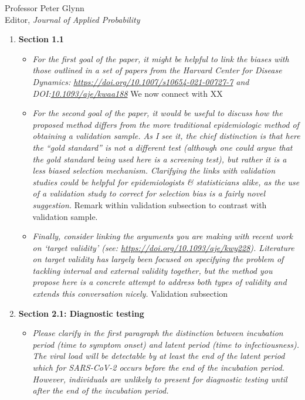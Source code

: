 \documentclass[11pt]{letter} %
\begin{document}
\begin{letter}{Professor
	Peter Glynn\\
	Editor, {\em Journal of Applied Probability}}
\begin{enumerate}
\vspace{5mm}
Section XX now discusses the purposes of testing.
\vspace{5mm}

\item {\bf Section 1.1}
\begin{itemize}
	\item {\it For the first goal of the paper, it might be helpful to link the biases with those outlined in a set of papers from the Harvard Center for Disease Dynamics: \url{https://doi.org/10.1007/s10654-021-00727-7} and DOI:\url{10.1093/aje/kwaa188}}
	\vspace{5mm}
	We now connect with XX
	\vspace{5mm}
	\item {\it For the second goal of the paper, it would be useful to discuss how the proposed method differs from the more traditional epidemiologic method of obtaining a validation sample. As I see it, the chief distinction is that here the “gold standard” is not a different test (although one could argue that the gold standard being used here is a screening test), but rather it is a less biased selection mechanism. Clarifying the links with validation studies could be helpful for epidemiologists \& statisticians alike, as the use of a validation study to correct for selection bias is a fairly novel suggestion.}
	\vspace{5mm}
	Remark within validation subsection to contrast with validation sample.
	\vspace{5mm}
	\item {\it Finally, consider linking the arguments you are making with recent work on ‘target validity’ (see: \url{https://doi.org/10.1093/aje/kwy228}). Literature on target validity has largely been focused on specifying the problem of tackling internal and external validity together, but the method you propose here is a concrete attempt to address both types of validity and extends this conversation nicely.}
	\vspace{5mm}
	Validation subsection
	\vspace{5mm}
\end{itemize}
\item {\bf Section 2.1: Diagnostic testing}
\begin{itemize}
	\item {\it Please clarify in the first paragraph the distinction between incubation period (time to symptom onset) and latent period (time to infectiousness). The viral load will be detectable by at least the end of the latent period which for SARS-CoV-2 occurs before the end of the incubation period. However, individuals are unlikely to present for diagnostic testing until after the end of the incubation period.}
	\vspace{5mm}


\end{itemize}
\end{enumerate}
\end{letter}
\end{document}
